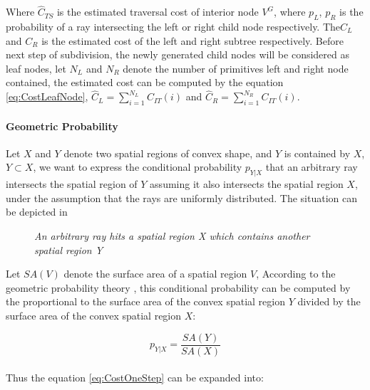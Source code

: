Where \( \hat{C}_{TS} \) is the estimated traversal cost of interior node \( V^{G} \), where \( p_{L}\), \(p_{R}\) is the probability of a ray intersecting the left or right child node respectively. The\( C_{L} \) and \(C_{R}\) is the estimated cost of the left and right subtree respectively. Before next step of subdivision, the newly generated child nodes will be considered as leaf nodes, let \( N_{L} \) and \( N_{R} \) denote the number of primitives left and right node contained, the estimated cost can be computed by the equation \ref{eq:CostLeafNode}, \( \hat{C}_{L} =  \sum_{i=1}^{N_{L}} C_{IT}(i) \) and \( \hat{C}_{R} =  \sum_{i=1}^{N_{R}} C_{IT}(i) \).  

\paragraph{Geometric Probability} 
Let \( X \) and \( Y \) denote two spatial regions of convex shape, and \( Y \) is contained by \( X \), \( Y \subset X \), we want to express the conditional probability  \( p_{Y|X}  \) that an arbitrary ray intersects the spatial region of \( Y \) assuming it also intersects the spatial region \( X \), under the assumption that the rays are uniformly distributed. The situation can be depicted in 

\begin{figure}[htp] 
    \centering 
    \label{fig:GeometricProbability} 
    \renewcommand{\thefigure}{\thechapter.\arabic{figure}}
    \caption[Geometric Probability]{\emph{An arbitrary ray hits a spatial region X which contains another spatial region Y}}
\end{figure} 

Let \( SA(V) \) denote the surface area of a spatial region \( V \), According to the geometric probability theory \cite{}, this conditional probability can be computed by the proportional to the surface area of the convex spatial region \( Y \) divided by the surface area of the convex spatial region \( X \): 

\begin{equation} 
    \label{eq:GeometricProbability}
    p_{Y|X} = \frac{SA(Y)}{SA(X)}
\end{equation}

\paragraph{}
Thus the equation \ref{eq:CostOneStep} can be expanded into: 


